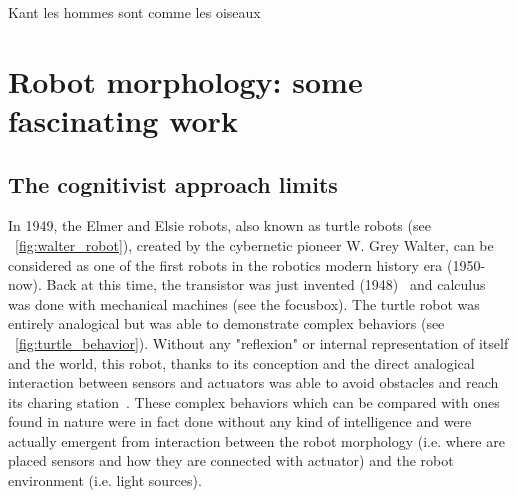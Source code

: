 
% 

Kant les hommes sont comme les oiseaux

\chapter{Robot morphology: some fascinating work} %


\section{The cognitivist approach limits} %

In 1949, the Elmer and Elsie robots, also known as turtle robots (see \figurename~\ref{fig:walter_robot}), created by the cybernetic pioneer W. Grey Walter, can be considered as one of the first robots in the robotics modern history era (1950-now). Back at this time, the transistor was just invented (1948)~\cite{brinkman1997history} and calculus was done with mechanical machines (see the focusbox). The turtle robot was entirely analogical but was able to demonstrate complex behaviors (see \figurename~\ref{fig:turtle_behavior}). Without any "reflexion" or internal representation of itself and the world, this robot, thanks to its conception and the direct analogical interaction between sensors and actuators was able to avoid obstacles and reach its charing station~\cite{walter1950imitation}. These complex behaviors which can be compared with ones found in nature were in fact done without any kind of intelligence and were actually emergent from interaction between the robot morphology (i.e. where are placed sensors and how they are connected with actuator) and the robot environment (i.e. light sources).

\begin{figure}[]
\centering
    \hfil
    \caption{}
    \label{fig:turtle_robot}
\end{figure}

